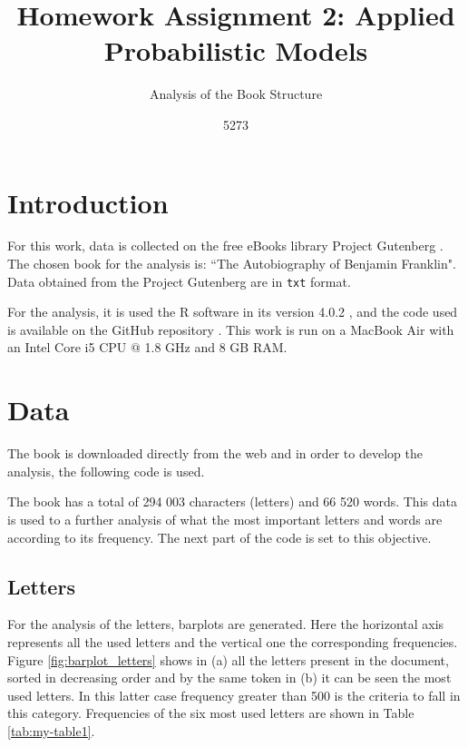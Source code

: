 \documentclass[10pt,leter,openany]{article}
\author{5273}
\title{Homework Assignment 2: Applied Probabilistic Models}
\subtitle{Analysis of the Book Structure}
\date{}
\begin{document}
	
\maketitle

\section{Introduction}
	
	For this work, data is collected on the free eBooks library Project Gutenberg \cite{gutenberg}. The chosen book for the analysis is: ``The Autobiography of Benjamin Franklin". Data obtained from the Project Gutenberg are in \texttt{txt} format.
	
	For the analysis, it is used the R software in its version 4.0.2 \citep{r}, and the code used is available on the GitHub repository \citep{github}. This work is run on a MacBook Air with an Intel Core i5 CPU $ @ $ 1.8 GHz and 8 GB RAM.
	
\section{Data}
	 
	The book is downloaded directly from the web and in order to develop the analysis, the following code is used.
	
	
	
	The book has a total of 294 003 characters (letters) and 66 520 words. This data is used to a further analysis of what the most important letters and words are according to its frequency. The next part of the code is set to this objective.
	
\newpage

	


\subsection{Letters}
	For the analysis of the letters, barplots are generated. Here the horizontal axis represents all the used letters and the vertical one the corresponding frequencies. Figure \ref{fig:barplot_letters} shows in (a) all the letters present in the document, sorted in decreasing order and by the same token in (b)  it can be seen the most used letters. In this latter case frequency greater than 500 is the criteria to fall in this category.  Frequencies of the six most used letters are shown in Table \ref{tab:my-table1}. 
\end{document}
